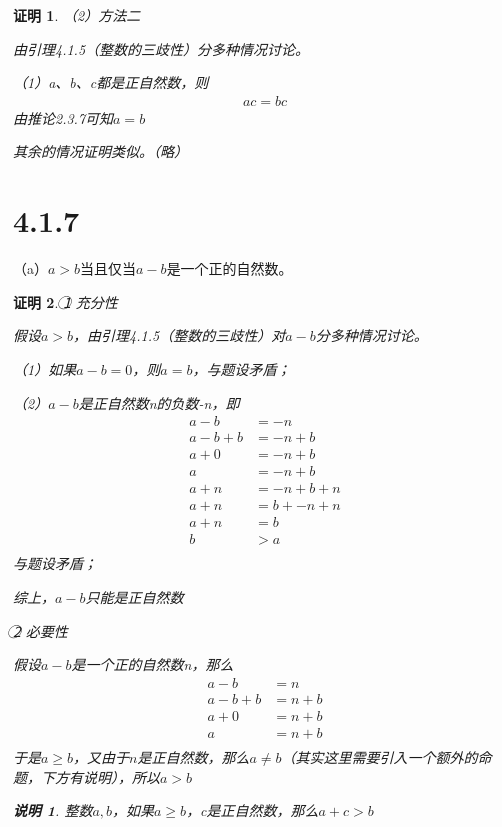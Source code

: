 \documentclass{article}
\theoremstyle{mystyle}
\newtheorem*{zremark}{说明}
\theoremstyle{zproofstyle}
\newtheorem*{zproof}{证明}
\begin{document}
\begin{zproof}
  （2）方法二

  由引理4.1.5（整数的三歧性）分多种情况讨论。

  （1）a、b、c都是正自然数，则
  \begin{align*}
    ac = bc
  \end{align*}
  由推论2.3.7可知$a=b$

  其余的情况证明类似。（略）

\end{zproof}

\section*{4.1.7}

（a）$a > b$当且仅当$a-b$是一个正的自然数。
\begin{zproof}
  \textcircled{1} 充分性

  假设$a>b$，由引理4.1.5（整数的三歧性）对$a-b$分多种情况讨论。

  （1）如果$a-b=0$，则$a=b$，与题设矛盾；

  （2）$a-b$是正自然数n的负数-n，即
  \begin{align*}
    a - b     & = -n         \\
    a - b + b & = -n + b     \\
    a + 0     & = -n + b     \\
    a         & = -n + b     \\
    a + n     & = -n + b + n \\
    a + n     & = b + -n + n \\
    a + n     & = b          \\
    b         & > a          \\
  \end{align*}
  与题设矛盾；

  综上，$a-b$只能是正自然数

  \textcircled{2} 必要性

  假设$a-b$是一个正的自然数n，那么
  \begin{align*}
    a - b     & = n     \\
    a - b + b & = n + b \\
    a + 0     & = n + b \\
    a         & = n + b \\
  \end{align*}
  于是$a \geq b$，又由于$n$是正自然数，那么$a \neq b$（其实这里需要引入一个额外的命题，下方有说明），所以$a > b$

  \begin{zgraytheorem}
    \begin{zremark}
      整数$a,b$，如果$a \geq b$，c是正自然数，那么$a + c > b$


\end{zremark}
\end{zgraytheorem}
\end{zproof}
\end{document}
